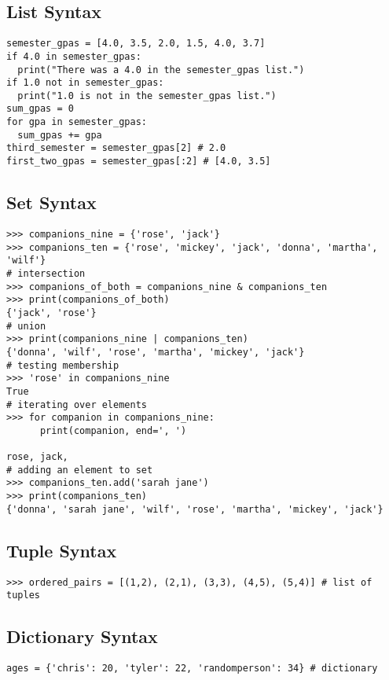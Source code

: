 \documentclass[11pt]{cselabheader}
\begin{document}
\subsection{List Syntax}

\begin{lstlisting}
semester_gpas = [4.0, 3.5, 2.0, 1.5, 4.0, 3.7]
if 4.0 in semester_gpas:
  print("There was a 4.0 in the semester_gpas list.")
if 1.0 not in semester_gpas:
  print("1.0 is not in the semester_gpas list.")
sum_gpas = 0
for gpa in semester_gpas:
  sum_gpas += gpa
third_semester = semester_gpas[2] # 2.0
first_two_gpas = semester_gpas[:2] # [4.0, 3.5]
\end{lstlisting}

\subsection{Set Syntax}

\begin{lstlisting}[style=ipython]
>>> companions_nine = {'rose', 'jack'}
>>> companions_ten = {'rose', 'mickey', 'jack', 'donna', 'martha', 'wilf'}
# intersection
>>> companions_of_both = companions_nine & companions_ten
>>> print(companions_of_both)
{'jack', 'rose'}
# union
>>> print(companions_nine | companions_ten)
{'donna', 'wilf', 'rose', 'martha', 'mickey', 'jack'}
# testing membership
>>> 'rose' in companions_nine
True
# iterating over elements
>>> for companion in companions_nine:
      print(companion, end=', ')

rose, jack, 
# adding an element to set
>>> companions_ten.add('sarah jane')
>>> print(companions_ten)
{'donna', 'sarah jane', 'wilf', 'rose', 'martha', 'mickey', 'jack'}
\end{lstlisting}

\subsection{Tuple Syntax}

\begin{lstlisting}[style=ipython]
>>> ordered_pairs = [(1,2), (2,1), (3,3), (4,5), (5,4)] # list of tuples
\end{lstlisting}

\subsection{Dictionary Syntax}

\begin{lstlisting}[style=ipython]
ages = {'chris': 20, 'tyler': 22, 'randomperson': 34} # dictionary
\end{lstlisting}
\end{document}
